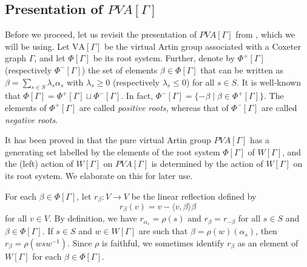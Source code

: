 \documentclass[12pt]{amsart}
\numberwithin{equation}{section}
\begin{document}
\subsection{Presentation of $PVA[\Gamma]$}
Before we proceed, let us revisit the presentation of $PVA[\Gamma]$ from \cite{MR4753773}, which we will be using. Let $\text{VA}[\Gamma]$ be the virtual Artin group associated with a Coxeter graph $\Gamma$, and let $\Phi[\Gamma]$ be its root system. Further, denote by $\Phi^+[\Gamma]$ (respectively $\Phi^-[\Gamma]$) the set of elements $\beta\in\Phi[\Gamma]$ that can be written as $\beta=\sum_{s\in S}\lambda_s\alpha_s$ with $\lambda_s\ge0$ (respectively $\lambda_s\le0$) for all $s\in S$. It is well-known that $\Phi[\Gamma]=\Phi^+[\Gamma]\sqcup\Phi^-[\Gamma]$. In fact, $\Phi^-[\Gamma]=\{-\beta\mid\beta\in\Phi^+[\Gamma]\}$. The elements of $\Phi^+[\Gamma]$ are called {\it positive roots}, whereas that of $\Phi^-[\Gamma]$ are called {\it negative roots}.
\par

It has been proved in \cite{MR4753773} that the pure virtual Artin group $PVA[\Gamma]$ has a generating set labelled by the elements of the root system $\Phi[\Gamma]$ of $W[\Gamma]$, and the (left) action of $W[\Gamma]$ on $PVA[\Gamma]$ is determined by the action of $W[\Gamma]$ on its root system. We elaborate on this for later use.
\par

For each $\beta\in\Phi[\Gamma]$, let $r_\beta:V\to V$ be the linear reflection defined by $$r_\beta(v)=v-\langle v,\beta\rangle\beta$$
for all $v \in V$. By definition, we have $r_{\alpha_s}=\rho(s)$ and
$r_\beta=r_{-\beta}$ for all $s\in S$ and $\beta\in\Phi[\Gamma]$.  If $s\in S$ and $w\in W[\Gamma]$ are such that $\beta= \rho(w)(\alpha_s)$, then $r_\beta= \rho(wsw^{-1})$. Since $\rho$ is faithful, we sometimes identify $r_\beta$ as an element of $W[\Gamma]$ for each $\beta\in\Phi[\Gamma]$. 
\par 
\end{document}
